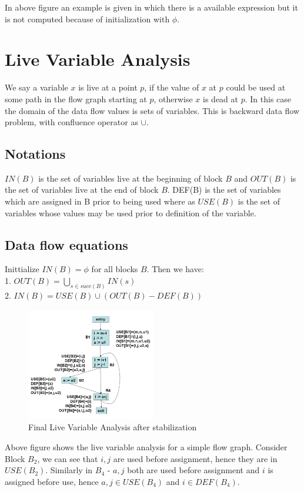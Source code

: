 \documentclass{article}
\begin{document}
In above figure an example is given in which there is a available expression but it is not computed because of initialization with $\phi$. \\

\section*{Live Variable Analysis}
We say a variable $x$ is live at a point $p$, if the value of $x$ at $p$ could be used at some path in the flow graph starting at $p$, otherwise $x$ is dead at $p$. In this case the domain of the data flow values is sets of variables. This is backward data flow problem, with confluence operator as $\cup$. \\

\subsection*{Notations}
$IN(B)$ is the set of variables live at the beginning of block $B$ and $OUT(B)$ is the set of variables live at the end of block $B$. DEF(B) is the set of variables which are assigned in B prior to being used where as $USE(B)$ is the set of variables whose values may be used prior to definition of the variable. \\

\subsection*{Data flow equations}
Inittialize $IN(B) = \phi$ for all blocks $B$. Then we have: \\
1. $OUT(B) = \bigcup_{s \in succ(B)} IN(s)$ \\
2. $IN(B) = USE(B) \cup (OUT(B) - DEF(B))$ \\

\begin{figure}[h]
    \centering
    \includegraphics[width=0.5\textwidth]{Images/live.png}
    \caption{Final Live Variable Analysis after stabilization}
    \label{fig:LiveVariableAnalysis}
\end{figure}

Above figure shows the live variable analysis for a simple flow graph. Consider Block $B_2$, we can see that $i,j$ are used before assignment, hence they are in $USE(B_2)$. Similarly in $B_4$ - $a,j$ both are used before assignment and $i$ is assigned before use, hence $a,j \in USE(B_4)$ and $i \in DEF(B_4)$. \\
\end{document}
